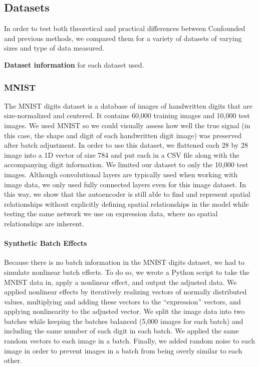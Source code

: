 \documentclass[notitlepage]{article}
\begin{document}
\subsection{Datasets}

In order to test both theoretical and practical differences between Confounded and previous methods, we compared them for a variety of datasets of varying sizes and type of data measured.

\begin{table}
	\centering
	
	\caption{\textbf{Dataset information} for each dataset used.}
	\label{tab:datasets}
\end{table}

\subsubsection{MNIST}

The MNIST digits dataset \cite{lecun_mnist_nodate} is a database of images of handwritten digits that are size-normalized and centered.
It contains 60,000 training images and 10,000 test images.
We used MNIST so we could visually assess how well the true signal (in this case, the shape and digit of each handwritten digit image) was preserved after batch adjustment.
In order to use this dataset, we flattened each 28 by 28 image into a 1D vector of size 784 and put each in a CSV file along with the accompanying digit information.
We limited our dataset to only the 10,000 test images.
Although convolutional layers are typically used when working with image data, we only used fully connected layers even for this image dataset.
In this way, we show that the autoencoder is still able to find and represent spatial relationships without explicitly defining spatial relationships in the model while testing the same network we use on expression data, where no spatial relationships are inherent.

\paragraph{Synthetic Batch Effects}

Because there is no batch information in the MNIST digits dataset, we had to simulate nonlinear batch effects.
To do so, we wrote a Python script to take the MNIST data in, apply a nonlinear effect, and output the adjusted data.
We applied nonlinear effects by iteratively realizing vectors of normally distributed values, multiplying and adding these vectors to the ``expression'' vectors, and applying nonlinearity to the adjusted vector.
We split the image data into two batches while keeping the batches balanced (5,000 images for each batch) and including the same number of each digit in each batch.
We applied the same random vectors to each image in a batch.
Finally, we added random noise to each image in order to prevent images in a batch from being overly similar to each other.
\end{document}
